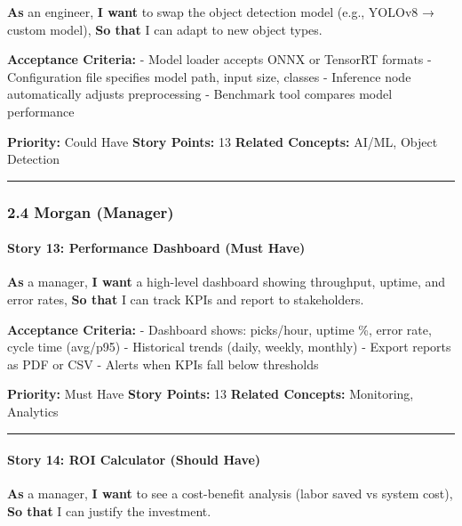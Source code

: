 \documentclass[
]{article}
\begin{document}
\textbf{As} an engineer, \textbf{I want} to swap the object detection
model (e.g., YOLOv8 → custom model), \textbf{So that} I can adapt to new
object types.

\textbf{Acceptance Criteria:} - Model loader accepts ONNX or TensorRT
formats - Configuration file specifies model path, input size, classes -
Inference node automatically adjusts preprocessing - Benchmark tool
compares model performance

\textbf{Priority:} Could Have \textbf{Story Points:} 13 \textbf{Related
Concepts:} AI/ML, Object Detection

\begin{center}\rule{0.5\linewidth}{0.5pt}\end{center}

\hypertarget{morgan-manager}{%
\subsubsection{2.4 Morgan (Manager)}\label{morgan-manager}}

\hypertarget{story-13-performance-dashboard-must-have}{%
\paragraph{Story 13: Performance Dashboard (Must
Have)}\label{story-13-performance-dashboard-must-have}}

\textbf{As} a manager, \textbf{I want} a high-level dashboard showing
throughput, uptime, and error rates, \textbf{So that} I can track KPIs
and report to stakeholders.

\textbf{Acceptance Criteria:} - Dashboard shows: picks/hour, uptime \%,
error rate, cycle time (avg/p95) - Historical trends (daily, weekly,
monthly) - Export reports as PDF or CSV - Alerts when KPIs fall below
thresholds

\textbf{Priority:} Must Have \textbf{Story Points:} 13 \textbf{Related
Concepts:} Monitoring, Analytics

\begin{center}\rule{0.5\linewidth}{0.5pt}\end{center}

\hypertarget{story-14-roi-calculator-should-have}{%
\paragraph{Story 14: ROI Calculator (Should
Have)}\label{story-14-roi-calculator-should-have}}

\textbf{As} a manager, \textbf{I want} to see a cost-benefit analysis
(labor saved vs system cost), \textbf{So that} I can justify the
investment.
\end{document}
